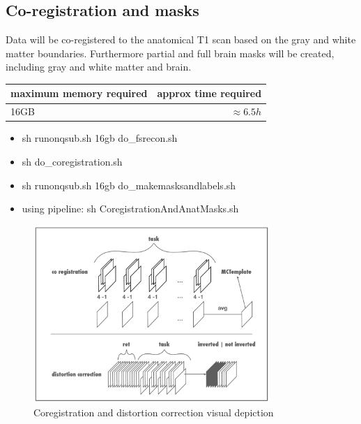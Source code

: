 \documentclass[12pt,a4paper]{scrartcl}
\begin{document}
\subsection{Co-registration and masks}
Data will be co-registered to the anatomical T1 scan based on the gray and white matter boundaries. Furthermore partial and full brain masks will be created, including gray and white matter and brain.
\begin{table}[h]
\begin{tabular}{l | r}
\toprule
maximum memory required & approx time required\\\toprule
16GB & $\approx 6.5h$ \\\bottomrule
\end{tabular}
\end{table}
\begin{itemize}
\item sh runonqsub.sh 16gb do\_fsrecon.sh
\item sh do\_coregistration.sh
\item sh runonqsub.sh 16gb do\_makemasksandlabels.sh
\item using pipeline: sh CoregistrationAndAnatMasks.sh
\end{itemize}

\begin{figure}
\begin{center}
\includegraphics[width=0.8\textwidth]{coregdist}
\caption[Coregistration and distortion correction visual depiction]{Coregistration and distortion correction visual depiction}
\end{center}
\end{figure}
\end{document}
